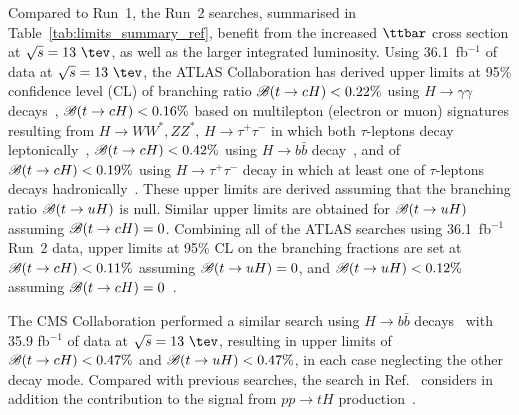 \documentclass[PAPER, coverpage, atlasdraft=true, texlive=2016, UKenglish]{\ATLASLATEXPATH atlasdoc}
\begin{document}
Compared to Run~1, the Run~2 searches, summarised in Table~\ref{tab:limits_summary_ref}, benefit from the increased $\ttbar$ cross section at $\sqrt{s}=13~\tev$, as well as the larger integrated luminosity.
Using 36.1~fb$^{-1}$ of data at $\sqrt{s}=13~\tev$, the ATLAS Collaboration has derived upper limits at 95\% confidence level (CL) of branching ratio
$\mathscr{B}(t\to cH)<0.22\%$ using $H\to \gamma\gamma$ decays~\cite{Aaboud:2017mfd}, $\mathscr{B}(t\to cH)<0.16\%$ based on
multilepton (electron or muon) signatures resulting from 
$H \to  WW^*, ZZ^*$, $H\to \tau^+\tau^-$ in which both $\tau$-leptons decay leptonically~\cite{Aaboud:2018pob},
$\mathscr{B}(t\to cH)<0.42\%$ using $H\to b\bar{b}$ decay~\cite{fcnc36}, and of $\mathscr{B}(t\to cH)<0.19\%$ using $H\to \tau^+\tau^-$ decay in which at least
one of $\tau$-leptons decays hadronically~\cite{fcnc36}.  
These upper limits are derived assuming that the branching ratio $\mathscr{B}(t\to uH)$ is null. Similar upper limits are obtained for $\mathscr{B}(t\to uH)$ assuming $\mathscr{B}(t\to cH)=0$.
Combining all of the ATLAS searches using 36.1~fb$^{-1}$ Run~2 data, upper limits at 95\% CL on the branching fractions are 
set at $\mathscr{B}(t\to cH)<0.11\%$ assuming $\mathscr{B}(t\to uH)=0$, and $\mathscr{B}(t\to uH)<0.12\%$ assuming $\mathscr{B}(t\to cH)=0$~\cite{fcnc36}.

The CMS Collaboration performed a similar search using  
$H\to b\bar{b}$ decays~\cite{Sirunyan:2017uae} with 35.9 fb$^{-1}$ of data at $\sqrt{s}=13~\tev$, resulting 
in upper limits of $\mathscr{B}(t\to cH)<0.47\%$ and $\mathscr{B}(t\to uH)<0.47\%$, in each case neglecting the other decay mode.
Compared with previous searches, the search in Ref.~\cite{Sirunyan:2017uae} considers in addition the contribution to the signal from 
$pp \to tH$ production~\cite{Greljo:2014dka}. 
\end{document}

